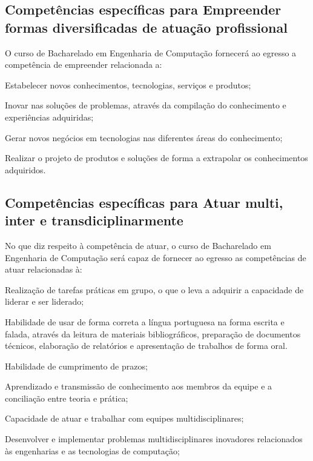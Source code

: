 \subsection*{Competências específicas para Empreender formas diversificadas de atuação profissional}

O curso de Bacharelado em Engenharia de Computação fornecerá ao egresso a competência de empreender relacionada a:

\begin{compitem}
    \item Estabelecer novos conhecimentos, tecnologias, serviços e produtos;
    \item Inovar nas soluções de problemas, através da compilação do conhecimento e experiências adquiridas;
    \item Gerar novos negócios em tecnologias nas diferentes áreas do conhecimento; %
    \item Realizar o projeto de produtos e soluções de forma a extrapolar os conhecimentos adquiridos.
\end{compitem}

\subsection*{Competências específicas para Atuar multi, inter e transdiciplinarmente}

No que diz respeito à competência de atuar, o curso de Bacharelado em Engenharia de Computação será capaz de fornecer ao egresso as competências de atuar relacionadas à:

\begin{compitem}
    \item Realização de tarefas práticas em grupo, o que o leva a adquirir a capacidade de liderar e ser liderado;
    \item Habilidade de usar de forma correta a língua portuguesa na forma escrita e falada, através da leitura de materiais bibliográficos, preparação de documentos técnicos, elaboração de relatórios e apresentação de trabalhos de forma oral.
    \item Habilidade de cumprimento de prazos;
    \item Aprendizado e transmissão de conhecimento aos membros da equipe e a conciliação entre teoria e prática;
    \item Capacidade de atuar e trabalhar com equipes multidisciplinares;
    \item Desenvolver e implementar problemas multidisciplinares inovadores relacionados às engenharias e as tecnologias de computação;
\end{compitem}

